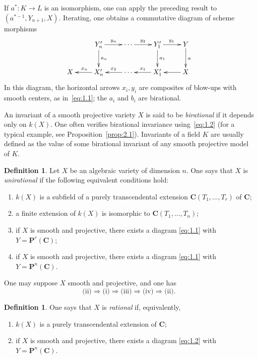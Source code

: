 \documentclass[12pt]{amsart}
\theoremstyle{plain}
\theoremstyle{definition}
\newtheorem{definition}[theorem]{Definition}
\theoremstyle{remark}
\begin{document}
If $a^*\colon K\to L$ is an isomorphism, one can apply the preceding result to
$(a^{*-1},Y_{n+1},X)$. Iterating, one obtains a commutative diagram of scheme
morphisms
\begin{equation}\label{eq:1.2}
\xymatrix{
& Y_n' \ar[r]^{y_n} \ar[d]^{a_n} & \cdots \ar[r]^{y_2} & Y_1' \ar[r]^{y_1} \ar[d]^{a_1} & Y \ar[d]^a \\
X & X_n' \ar[l]_{x_n} & \cdots \ar[l]_{x_2} & X_1' \ar[l]_{x_1} & X \ar[l]
}
\end{equation}
In this diagram, the horizontal arrows $x_i,y_i$ are composites of blow-ups with
smooth centers, as in~\eqref{eq:1.1}; the $a_i$ and $b_i$ are birational.

An invariant of a smooth projective variety $X$ is said to be
\emph{birational} if it depends only on $k(X)$. One often verifies birational
invariance using~\eqref{eq:1.2} (for a typical example, see
Proposition~\ref{prop:2.1}). Invariants of a field $K$ are usually defined as the
value of some birational invariant of any smooth projective model of $K$.

\begin{definition}\label{def:1.3}
Let $X$ be an algebraic variety of dimension $n$. One says that $X$ is
\emph{unirational} if the following equivalent conditions hold:
\begin{enumerate}
\item[(i)] $k(X)$ is a subfield of a purely transcendental extension
$\mathbf{C}(T_1,\ldots,T_r)$ of $\mathbf{C}$;
\item[(ii)] a finite extension of $k(X)$ is isomorphic to
$\mathbf{C}(T_1,\ldots,T_n)$;
\item[(iii)] if $X$ is smooth and projective, there exists a diagram
\eqref{eq:1.1} with $Y=\mathbf{P}^r(\mathbf{C})$;
\item[(iv)] if $X$ is smooth and projective, there exists a diagram
\eqref{eq:1.1} with $Y=\mathbf{P}^n(\mathbf{C})$.
\end{enumerate}
One may suppose $X$ smooth and projective, and one has
\[
\text{(ii)}\Rightarrow\text{(i)}\Rightarrow\text{(iii)}\Rightarrow\text{(iv)}\Rightarrow\text{(ii)}.
\]
\end{definition}

\begin{definition}\label{def:1.4}
One says that $X$ is \emph{rational} if, equivalently,
\begin{enumerate}
\item[(i)] $k(X)$ is a purely transcendental extension of $\mathbf{C}$;
\item[(ii)] if $X$ is smooth and projective, there exists a diagram
\eqref{eq:1.2} with $Y=\mathbf{P}^n(\mathbf{C})$.
\end{enumerate}
\end{definition}
\end{document}
